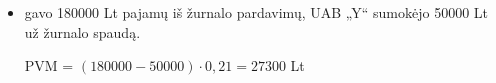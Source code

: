 \begin{exmp}
\begin{itemize}
    \item gavo 180000 Lt pajamų iš žurnalo pardavimų, UAB „Y“ sumokėjo
      50000 Lt už žurnalo spaudą.

      PVM = $(180000 - 50000)\cdot 0,21 = 27300$ Lt

  \end{itemize}
\end{exmp}
